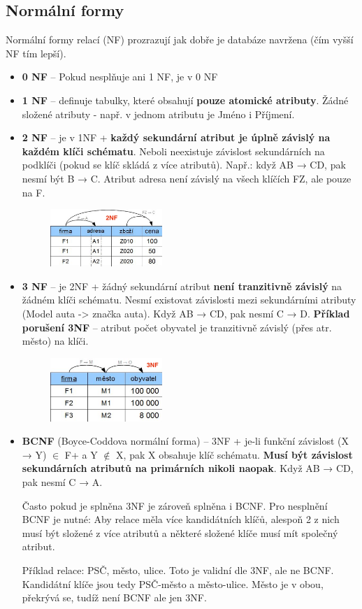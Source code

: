 \subsection{Normální formy}
Normální formy relací (NF) prozrazují jak dobře je databáze navržena (čím vyšší NF tím lepší).
\begin{itemize}
\item \textbf{0 NF} -- Pokud nesplňuje ani 1 NF, je v 0 NF
\item \textbf{1 NF} -- definuje tabulky, které obsahují \textbf{pouze atomické atributy}. Žádné složené atributy - např. v jednom atributu je Jméno i Příjmení.
\item \textbf{2 NF} -- je v 1NF + \textbf{každý sekundární atribut je úplně závislý na každém klíči schématu}. Neboli neexistuje závislost sekundárních na podklíči (pokud se klíč skládá z více atributů). Např.: když AB → CD, pak nesmí být B → C. Atribut adresa není závislý na všech klíčích FZ, ale pouze na F.
\begin{figure}[H]
	\centering
	\includegraphics[width=0.4\textwidth]{assets/2nf.png}
\end{figure}
\item \textbf{3 NF} -- je 2NF + žádný sekundární atribut \textbf{není tranzitivně závislý} na žádném klíči schématu. Nesmí existovat závislosti mezi sekundárními atributy (Model auta -> značka auta). Když AB → CD, pak nesmí C  → D. \textbf{Příklad porušení 3NF} -- atribut počet obyvatel je tranzitivně závislý (přes atr. město) na klíči.
\begin{figure}[H]
	\centering
	\includegraphics[width=0.4\textwidth]{assets/3nf.png}
\end{figure}
\item \textbf{BCNF} (Boyce-Coddova normální forma) -- 3NF + je-li funkční závislost (X → Y) $\in$ F+ a Y $\notin$ X, pak X obsahuje klíč schématu. \textbf{Musí být závislost sekundárních atributů na primárních nikoli naopak}. Když AB → CD, pak nesmí C  → A.

Často pokud je splněna 3NF je zároveň splněna i BCNF. Pro nesplnění BCNF je nutné: Aby relace měla více kandidátních klíčů, alespoň 2 z nich musí být složené z více atributů a některé složené klíče musí mít společný atribut.

Příklad relace: PSČ, město, ulice. Toto je validní dle 3NF, ale ne BCNF. Kandidátní klíče jsou tedy PSČ-město a město-ulice. Město je v obou, překrývá se, tudíž není BCNF ale jen 3NF.
\end{itemize}
